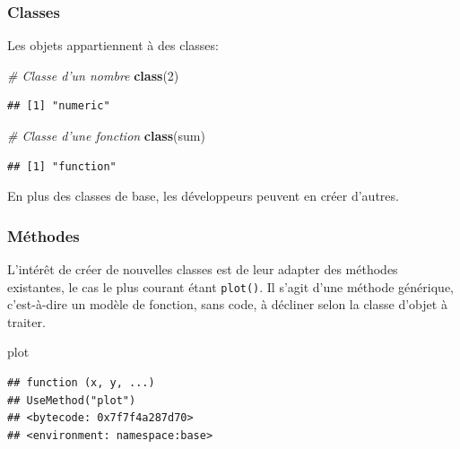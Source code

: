 \documentclass[
  12pt,
  french,
  a4paper,
  extrafontsizes,onecolumn,openright
  ]{memoir}
\newenvironment{Shaded}{\begin{snugshade}}{\end{snugshade}}
\newcommand{\CommentTok}[1]{\textcolor[rgb]{0.56,0.35,0.01}{\textit{#1}}}
\newcommand{\DecValTok}[1]{\textcolor[rgb]{0.00,0.00,0.81}{#1}}
\newcommand{\KeywordTok}[1]{\textcolor[rgb]{0.13,0.29,0.53}{\textbf{#1}}}
\newcommand{\NormalTok}[1]{#1}
\begin{document}
\hypertarget{classes}{%
\subsubsection{Classes}\label{classes}}

Les objets appartiennent à des classes:

\scriptsize

\begin{Shaded}
\begin{Highlighting}[]
\CommentTok{# Classe d'un nombre}
\KeywordTok{class}\NormalTok{(}\DecValTok{2}\NormalTok{)}
\end{Highlighting}
\end{Shaded}

\begin{verbatim}
## [1] "numeric"
\end{verbatim}

\begin{Shaded}
\begin{Highlighting}[]
\CommentTok{# Classe d'une fonction}
\KeywordTok{class}\NormalTok{(sum)}
\end{Highlighting}
\end{Shaded}

\begin{verbatim}
## [1] "function"
\end{verbatim}

\normalsize

En plus des classes de base, les développeurs peuvent en créer d'autres.

\hypertarget{muxe9thodes}{%
\subsubsection{Méthodes}\label{muxe9thodes}}

L'intérêt de créer de nouvelles classes est de leur adapter des méthodes existantes, le cas le plus courant étant \texttt{plot()}.
Il s'agit d'une méthode générique, c'est-à-dire un modèle de fonction, sans code, à décliner selon la classe d'objet à traiter.

\scriptsize

\begin{Shaded}
\begin{Highlighting}[]
\NormalTok{plot}
\end{Highlighting}
\end{Shaded}

\begin{verbatim}
## function (x, y, ...) 
## UseMethod("plot")
## <bytecode: 0x7f7f4a287d70>
## <environment: namespace:base>
\end{verbatim}
\end{document}
